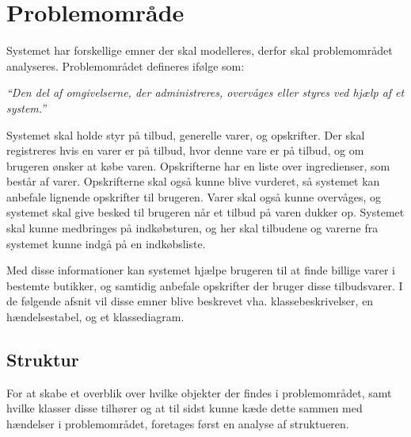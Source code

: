 \chapter{Problemområde}

Systemet har forskellige emner der skal modelleres, derfor skal problemområdet analyseres.
Problemområdet defineres ifølge \citep{OOA&D2001} som:

\textit{``Den del af omgivelserne, der administreres, overvåges eller styres ved hjælp af et system.''}

Systemet skal holde styr på tilbud, generelle varer, og opskrifter. 
Der skal registreres hvis en varer er på tilbud, hvor denne vare er på tilbud, og om brugeren ønsker at købe varen.
Opskrifterne har en liste over ingredienser, som består af varer. 
Opskrifterne skal også kunne blive vurderet, så systemet kan anbefale lignende opskrifter til brugeren.
Varer skal også kunne overvåges, og systemet skal give besked til brugeren når et tilbud på varen dukker op.
Systemet skal kunne medbringes på indkøbsturen, og her skal tilbudene og varerne fra systemet kunne indgå på en indkøbsliste.

Med disse informationer kan systemet hjælpe brugeren til at finde billige varer i bestemte butikker, og samtidig anbefale opskrifter der bruger disse tilbudsvarer.
I de følgende afsnit vil disse emner blive beskrevet vha. klassebeskrivelser, en hændelsestabel, og et klassediagram.

\section{Struktur}
For at skabe et overblik over hvilke objekter der findes i problemområdet, samt hvilke klasser disse tilhører og at til sidst kunne kæde dette sammen med hændelser i problemområdet, foretages først en analyse af struktueren.\\


